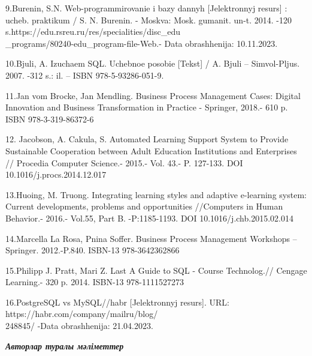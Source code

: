 \begin{noparindent}
9.Burenin, S.N. Web-programmirovanie i bazy dannyh {[}Jelektronnyj
resurs{]} : ucheb. praktikum / S. N. Burenin. - Moskva: Mosk. gumanit.
un-t. 2014. -120 s.https://edu.rsreu.ru/res/specialities/disc\_edu\\\_programs/80240-edu\_program-file-Web.-
Data obrashhenija: 10.11.2023.

10.B\textquotesingle juli, A. Izuchaem SQL. Uchebnoe posobie {[}Tekst{]}
/ A. B\textquotesingle juli -- Simvol-Pljus. 2007. -312 s.: il. -- ISBN
978-5-93286-051-9.

11.Jan vom Brocke, Jan Mendling. Business Process Management Cases:
Digital Innovation and Business Transformation in Practice - Springer,
2018.- 610 p. ISBN 978-3-319-86372-6

12. Jacobson, A. Cakula, S. Automated Learning Support System to Provide
Sustainable Cooperation between Adult Education Institutions and
Enterprises // Procedia Computer Science.- 2015.- Vol. 43.- P. 127-133.
DOI 10.1016/j.procs.2014.12.017

13.Huoing, M. Truong. Integrating learning styles and adaptive
e-learning system: Current developments, problems and opportunities
//Computers in Human Behavior.- 2016.- Vol.55, Part B. -P:1185-1193. DOI
10.1016/j.chb.2015.02.014

14.Marcella La Rosa, Pnina Soffer. Business Process Management Workshops
-- Springer. 2012.-P.840. ISBN-13 978-3642362866

15.Philipp J. Pratt, Mari Z. Last A Guide to SQL - Course Technolog.//
Cengage Learning.- 320 p. 2014. ISBN-13 978-1111527273

16.PostgreSQL vs MySQL//habr {[}Jelektronnyj resurs{]}. URL:
https://habr.com/company/mailru/blog/\\248845/ -Data obrashhenija:
21.04.2023.

\end{noparindent}


\emph{{\bfseries Авторлар туралы мәліметтер}}

